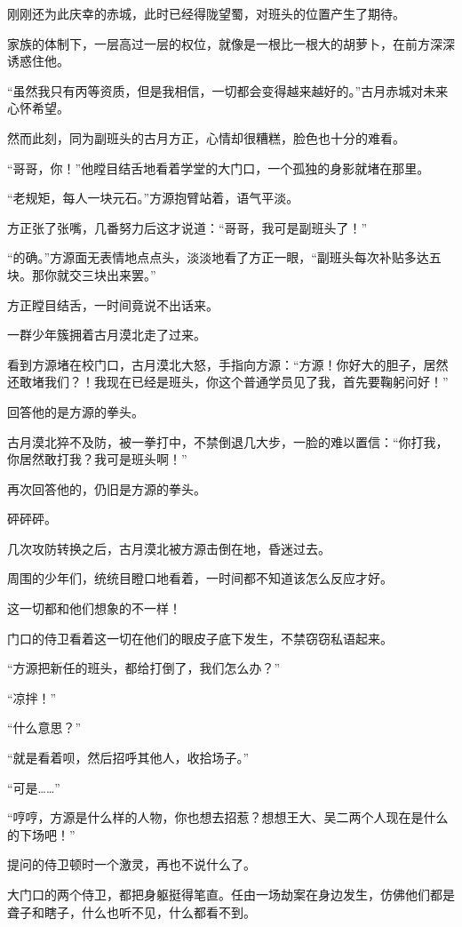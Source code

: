 \begin{this_body}
刚刚还为此庆幸的赤城，此时已经得陇望蜀，对班头的位置产生了期待。

家族的体制下，一层高过一层的权位，就像是一根比一根大的胡萝卜，在前方深深诱惑住他。

“虽然我只有丙等资质，但是我相信，一切都会变得越来越好的。”古月赤城对未来心怀希望。

然而此刻，同为副班头的古月方正，心情却很糟糕，脸色也十分的难看。

“哥哥，你！”他瞠目结舌地看着学堂的大门口，一个孤独的身影就堵在那里。

“老规矩，每人一块元石。”方源抱臂站着，语气平淡。

方正张了张嘴，几番努力后这才说道：“哥哥，我可是副班头了！”

“的确。”方源面无表情地点点头，淡淡地看了方正一眼，“副班头每次补贴多达五块。那你就交三块出来罢。”

方正瞠目结舌，一时间竟说不出话来。

一群少年簇拥着古月漠北走了过来。

看到方源堵在校门口，古月漠北大怒，手指向方源：“方源！你好大的胆子，居然还敢堵我们？！我现在已经是班头，你这个普通学员见了我，首先要鞠躬问好！”

回答他的是方源的拳头。

古月漠北猝不及防，被一拳打中，不禁倒退几大步，一脸的难以置信：“你打我，你居然敢打我？我可是班头啊！”

再次回答他的，仍旧是方源的拳头。

砰砰砰。

几次攻防转换之后，古月漠北被方源击倒在地，昏迷过去。

周围的少年们，统统目瞪口地看着，一时间都不知道该怎么反应才好。

这一切都和他们想象的不一样！

门口的侍卫看着这一切在他们的眼皮子底下发生，不禁窃窃私语起来。

“方源把新任的班头，都给打倒了，我们怎么办？”

“凉拌！”

“什么意思？”

“就是看着呗，然后招呼其他人，收拾场子。”

“可是……”

“哼哼，方源是什么样的人物，你也想去招惹？想想王大、吴二两个人现在是什么的下场吧！”

提问的侍卫顿时一个激灵，再也不说什么了。

大门口的两个侍卫，都把身躯挺得笔直。任由一场劫案在身边发生，仿佛他们都是聋子和瞎子，什么也听不见，什么都看不到。


\end{this_body}
